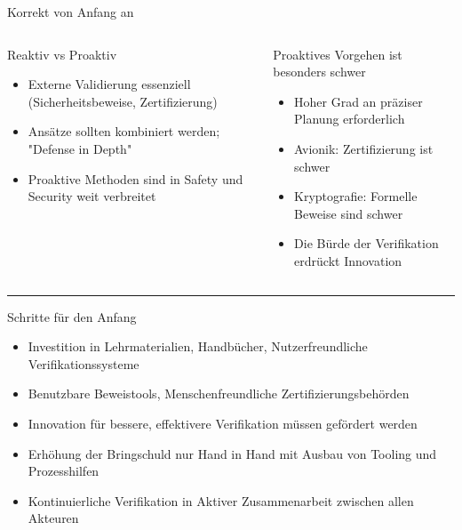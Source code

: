 \begin{frame}{Korrekt von Anfang an}
  \begin{columns}[t,fullwidth]
    \begin{column}{.3\linewidth}
      Reaktiv vs Proaktiv
      \tiny
      \vspace{0.5em}
      \begin{itemize}
        \item Externe Validierung essenziell (Sicherheitsbeweise, Zertifizierung)
        \item Ansätze sollten kombiniert werden; "Defense in Depth"
        \item Proaktive Methoden sind in Safety und Security weit verbreitet
      \end{itemize}
    \end{column}

    \vrule

    \begin{column}{.65\linewidth}
      Proaktives Vorgehen ist besonders schwer
      \tiny
      \vspace{0.5em}
      \begin{itemize}
        \item Hoher Grad an präziser Planung erforderlich %
        \item Avionik: Zertifizierung ist schwer
        \item Kryptografie: Formelle Beweise sind schwer
        \item Die Bürde der Verifikation erdrückt Innovation
      \end{itemize}
    \end{column}

  \end{columns}

  \hrule

  Schritte für den Anfang

  \tiny
  \begin{itemize}
    \item Investition in Lehrmaterialien, Handbücher, Nutzerfreundliche Verifikationssysteme
    \item Benutzbare Beweistools, Menschenfreundliche Zertifizierungsbehörden
    \item Innovation für bessere, effektivere Verifikation müssen gefördert werden
    \item Erhöhung der Bringschuld nur Hand in Hand mit Ausbau von Tooling und Prozesshilfen
    \item Kontinuierliche Verifikation in Aktiver Zusammenarbeit zwischen allen Akteuren
  \end{itemize}
\end{frame}


